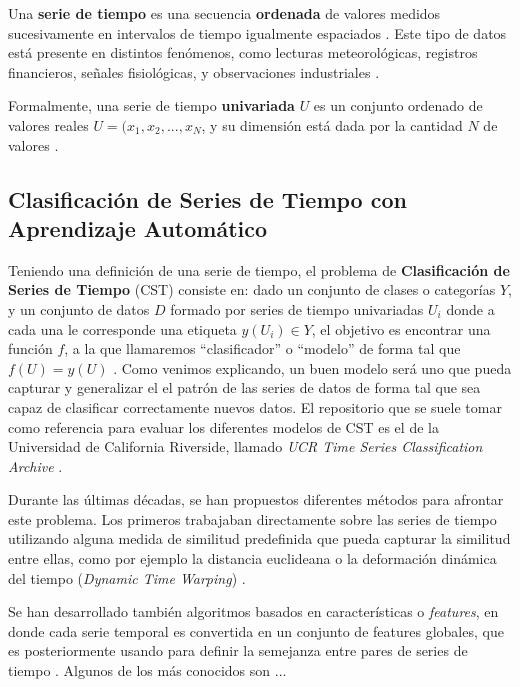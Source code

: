 \documentclass[../../main.tex]{subfiles}
\begin{document}
Una \textbf{serie de tiempo} es una secuencia \textbf{ordenada} de valores medidos
sucesivamente en intervalos de tiempo igualmente espaciados
\cite{khan2021-bilstm-for-unitsc}. Este tipo de datos está presente en distintos
fenómenos, como lecturas meteorológicas, registros financieros, señales fisiológicas, y
observaciones industriales \cite{wang2016timeseriesclassificationscratch}.

Formalmente, una serie de tiempo \textbf{univariada} \(U\) es un conjunto ordenado de
valores reales \(U = (x_1, x_2, ..., x_N\), y su dimensión está dada por la cantidad \(N\)
de valores \cite{khan2021-bilstm-for-unitsc}.

\subsection{Clasificación de Series de Tiempo con Aprendizaje Automático}
Teniendo una definición de una serie de tiempo, el problema de \textbf{Clasificación de
Series de Tiempo} (CST) consiste en: dado un conjunto de clases o categorías \(Y\), y un
conjunto de datos \(D\) formado por series de tiempo univariadas \(U_i\) donde a cada una
le corresponde una etiqueta \(y(U_i) \in Y\), el objetivo es encontrar una función \(f\),
a la que llamaremos ``clasificador'' o ``modelo'' de forma tal que \(f(U) = y(U)\)
\cite{khan2021-bilstm-for-unitsc}. Como venimos explicando, un buen modelo será uno que
pueda capturar y generalizar el el patrón de las series de datos de forma tal que sea
capaz de clasificar correctamente nuevos datos. El repositorio que se suele tomar como
referencia para evaluar los diferentes modelos de CST es el de la Universidad de
California Riverside, llamado \textit{UCR Time Series Classification Archive}
\cite{UCRArchive2018}.

Durante las últimas décadas, se han propuestos diferentes métodos para afrontar este
problema. Los primeros trabajaban directamente sobre las series de tiempo utilizando
alguna medida de similitud predefinida que pueda capturar la similitud entre ellas, como
por ejemplo la distancia euclideana o la deformación dinámica del tiempo (\textit{Dynamic
Time Warping}) \cite{wang2016timeseriesclassificationscratch}.

Se han desarrollado también algoritmos basados en características o \textit{features}, en
donde cada serie temporal es convertida en un conjunto de features globales, que es
posteriormente usando para definir la semejanza entre pares de series de tiempo
\cite{khan2021-bilstm-for-unitsc}. Algunos de los más conocidos son ...
\end{document}
